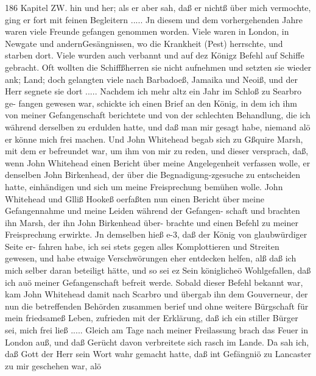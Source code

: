186 Kapitel ZW.
hin und her; als er aber sah, daß er nichtß über mich vermochte,
ging er fort mit feinen Begleitern .....
Jn diesem und dem vorhergehenden Jahre waren viele
Freunde gefangen genommen worden. Viele waren in London, in
Newgate und andernGesängnissen, wo die Krankheit (Pest) herrschte,
und starben dort. Viele wurden auch verbannt und auf dez
Königz Befehl auf Schiffe gebracht. Oft wollten die Schiffßherren
sie nicht aufnehmen und setzten sie wieder ank; Land; doch gelangten
viele nach Barbadoeß, Jamaika und Neoiß, und der Herr segnete
sie dort .....
Nachdem ich mehr altz ein Jahr im Schloß zu Searbro ge-
fangen gewesen war, schickte ich einen Brief an den König, in
dem ich ihm von meiner Gefangenschaft berichtete und von der
schlechten Behandlung, die ich während derselben zu erdulden
hatte, und daß man mir gesagt habe, niemand alö er könne mich
frei machen. Und John Whitehead begab sich zu Gßquire Marsh,
mit dem er befreundet war, um ihm von mir zu reden, und dieser
versprach, daß, wenn John Whitehead einen Bericht über meine
Angelegenheit verfassen wolle, er denselben John Birkenhead, der
über die Begnadigung-zgesuche zu entscheiden hatte, einhändigen
und sich um meine Freisprechung bemühen wolle. John
Whitehead und Glliß Hookeß oerfaßten nun einen Bericht über
meine Gefangennahme und meine Leiden während der Gefangen-
schaft und brachten ihn Marsh, der ihn John Birkenhead über-
brachte und einen Befehl zu meiner Freisprechung erwirkte. Jn
demselben hieß e-3, daß der König von glaubwürdiger Seite er-
fahren habe, ich sei stets gegen alles Komplottieren und Streiten
gewesen, und habe etwaige Verschwörungen eher entdecken helfen,
alß daß ich mich selber daran beteiligt hätte, und so sei ez Sein
königlicheö Wohlgefallen, daß ich auö meiner Gefangenschaft befreit
werde. Sobald dieser Befehl bekannt war, kam John Whitehead
damit nach Scarbro und übergab ihn dem Gouverneur, der nun
die betreffenden Behörden zusammen berief und ohne weitere
Bürgschaft für mein friedsameß Leben, zufrieden mit der Erklärung,
daß ich ein stiller Bürger sei, mich frei ließ .....
Gleich am Tage nach meiner Freilassung brach das Feuer
in London auß, und daß Gerücht davon verbreitete sich rasch im
Lande. Da sah ich, daß Gott der Herr sein Wort wahr gemacht
hatte, daß int Gefängniö zu Lancaster zu mir geschehen war, alö


